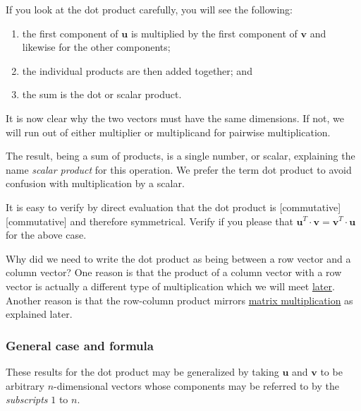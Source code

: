\documentclass[
  a4paper,
]{article}
\begin{document}
If you look at the dot product carefully, you will see the following:

\begin{enumerate}
\item
  the first component of \(\symbf{u}\) is multiplied by the first
  component of \(\symbf{v}\) and likewise for the other components;
\item
  the individual products are then added together; and
\item
  the sum is the dot or scalar product.
\end{enumerate}

It is now clear why the two vectors must have the same dimensions. If
not, we will run out of either multiplier or multiplicand for pairwise
multiplication.

The result, being a sum of products, is a single number, or scalar,
explaining the name \emph{scalar product} for this operation. We prefer
the term dot product to avoid confusion with multiplication by a scalar.

It is easy to verify by direct evaluation that the dot product is
{[}commutative{]}{[}commutative{]} and therefore symmetrical. Verify if
you please that
\(\symbf{u}^{T}\cdot\symbf{v} = \symbf{v}^{T}\cdot\symbf{u}\) for the
above case.

Why did we need to write the dot product as being between a row vector
and a column vector? One reason is that the product of a column vector
with a row vector is actually a different type of multiplication which
we will meet
\protect\hyperlink{outer-product-of-two-vectorscircledtimes}{later}.
Another reason is that the row-column product mirrors
\protect\hyperlink{example-of-matrix-multiplication}{matrix
multiplication} as explained later.

\hypertarget{general-case-and-formula}{%
\subsubsection{General case and
formula}\label{general-case-and-formula}}

These results for the dot product may be generalized by taking
\(\symbf{u}\) and \(\symbf{v}\) to be arbitrary \(n\)-dimensional
vectors whose components may be referred to by the \emph{subscripts}
\(1\) to \(n\).
\end{document}
